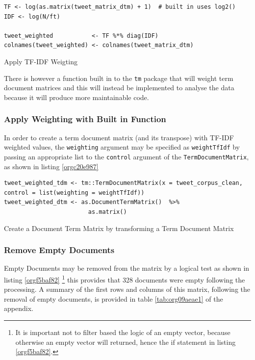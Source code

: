 \documentclass[11pt]{article}
\begin{document}
\begin{enumerate}
\begin{listing}[htbp]
\begin{verbatim}
TF <- log(as.matrix(tweet_matrix_dtm) + 1)  # built in uses log2()
IDF <- log(N/ft)

tweet_weighted           <- TF %*% diag(IDF)
colnames(tweet_weighted) <- colnames(tweet_matrix_dtm)
\end{verbatim}
\caption{\label{orgdf6d597}Apply TF-IDF Weigting}
\end{listing}

There is however a function built in to the \texttt{tm} package that will weight term document matrices and this will instead be implemented to analyse the data because it will produce more maintainable code.
\end{enumerate}

\subsubsection{Apply Weighting with Built in Function}
\label{sec:org6828859}
In order to create a term document matrix (and its transpose) with TF-IDF weighted values, the \texttt{weighting} argument may be specified as \texttt{weightTfIdf} by passing an appropriate list to the \texttt{control} argument of the \texttt{TermDocumentMatrix}, as shown in listing \ref{orgc20e987}

\begin{listing}[htbp]
\begin{verbatim}
tweet_weighted_tdm <- tm::TermDocumentMatrix(x = tweet_corpus_clean, control = list(weighting = weightTfIdf))
tweet_weighted_dtm <- as.DocumentTermMatrix()  %>%
                        as.matrix()
\end{verbatim}
\caption{\label{orgc20e987}Create a Document Term Matrix by transforming a Term Document Matrix}
\end{listing}

\subsubsection{Remove Empty Documents}
\label{sec:org2673104}
Empty Documents may be removed from the matrix by a logical test as shown in listing  \ref{orgf5baf82} \footnote{It is important not to filter based the logic of an empty vector, because
otherwise an empty vector will returned, hence the if statement in listing \ref{orgf5baf82}.} this provides that 328 documents were empty following the processing. A summary of the first rows and columns of this matrix, following the removal of empty documents, is provided in table \ref{tab:org09aeae1} of the appendix.
\end{document}
